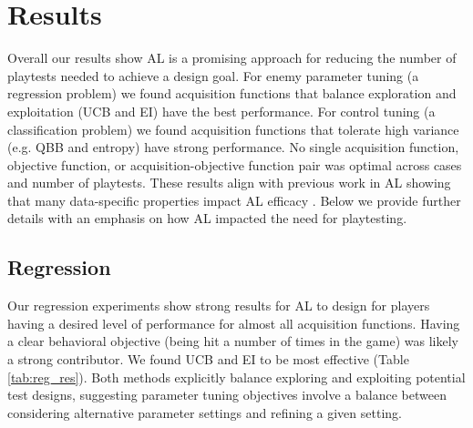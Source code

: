 \documentclass{sig-alternate}
\begin{document}




\section{Results}

Overall our results show AL is a promising approach for reducing the number of playtests needed to achieve a design goal.
For enemy parameter tuning (a regression problem) we found acquisition functions that balance exploration and exploitation (UCB and EI) have the best performance.
For control tuning (a classification problem) we found acquisition functions that tolerate high variance (e.g. QBB and entropy) have strong performance.
No single acquisition function, objective function, or acquisition-objective function pair was optimal across cases and number of playtests.
These results align with previous work in AL showing that many data-specific properties impact AL efficacy \cite{schein2007:al-logreg-eval}.
Below we provide further details with an emphasis on how AL impacted the need for playtesting.


\subsection{Regression}

Our regression experiments show strong results for AL to design for players having a desired level of performance for almost all acquisition functions.
Having a clear behavioral objective (being hit a number of times in the game) was likely a strong contributor.
We found UCB and EI to be most effective (Table \ref{tab:reg_res}).
Both methods explicitly balance exploring and exploiting potential test designs, suggesting parameter tuning objectives involve a balance between considering alternative parameter settings and refining a given setting.
\end{document}
